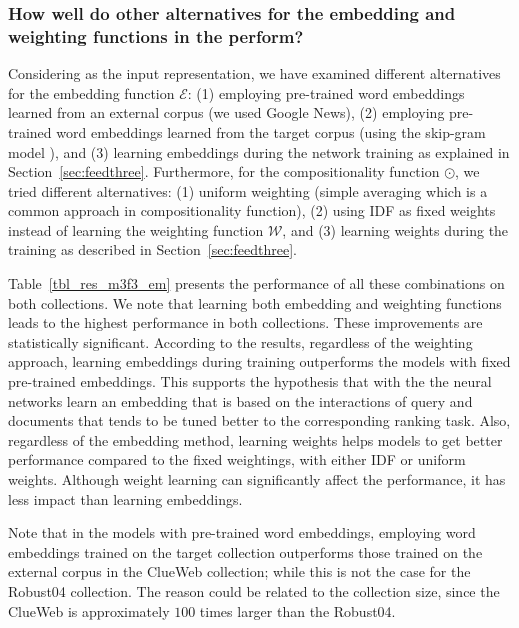 \subsubsection{How well do other alternatives for the embedding and weighting functions in the \feedthree perform?}
Considering \feedthree as the input representation, we have examined different alternatives for the embedding function $\mathcal{E}$: (1) employing pre-trained word embeddings learned from an external corpus (we used Google News), (2) employing pre-trained word embeddings learned from the target corpus (using the skip-gram model \cite{Mikolov:2013}), and (3) learning embeddings during the network training as explained in Section~\ref{sec:feedthree}. 
Furthermore, for the compositionality function $\odot$, we tried different alternatives: (1) uniform weighting (simple averaging which is a common approach in compositionality function), (2) using IDF as fixed weights instead of learning the weighting function $\mathcal{W}$, and (3) learning weights during the training as described in Section~\ref{sec:feedthree}.

Table~\ref{tbl_res_m3f3_em} presents the performance of all these combinations on both collections. 
We note that learning both embedding and weighting functions leads to the highest performance in both collections. These improvements are statistically significant.
%
According to the results, regardless of the weighting approach, learning embeddings during training outperforms the models with fixed pre-trained embeddings.
%
This supports the hypothesis that with the \feedthree the neural networks learn an embedding that is based on the interactions of query and documents that tends to be tuned better to the corresponding ranking task.
%
Also, regardless of the embedding method, learning weights helps models to get better performance compared to the fixed weightings, with either IDF or uniform weights. 
%
Although weight learning can significantly affect the performance, it has less impact than learning embeddings.

Note that in the models with pre-trained word embeddings, employing word embeddings trained on the target collection outperforms those trained on the external corpus in the ClueWeb collection; while this is not the case for the Robust04 collection. The reason could be related to the collection size, since the ClueWeb is approximately $100$ times larger than the Robust04.

